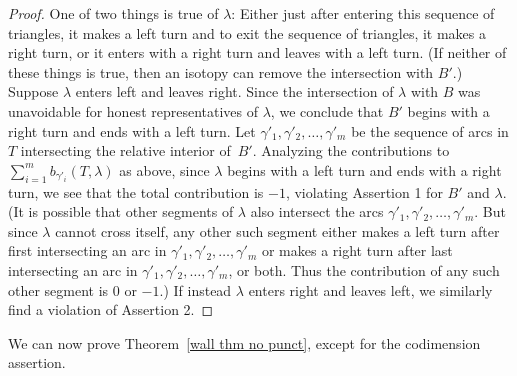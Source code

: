 \documentclass{amsart}
\theoremstyle{definition}
\theoremstyle{remark}
\numberwithin{equation}{section}
\newcommand{\0}{{\mathbf{0}}}
\begin{document}
\begin{proof}
One of two things is true of $\lambda$:  Either just after entering this sequence of triangles, it makes a left turn and to exit the sequence of triangles, it makes a right turn, or it enters with a right turn and leaves with a left turn.
(If neither of these things is true, then an isotopy can remove the intersection with $B'$.)
Suppose $\lambda$ enters left and leaves right.
Since the intersection of $\lambda$ with $B$ was unavoidable for honest representatives of $\lambda$, we conclude that $B'$ begins with a right turn and ends with a left turn.
Let $\gamma'_1, \gamma'_2,\ldots,\gamma'_m$ be the sequence of arcs in $T$ intersecting the relative interior of~$B'$.
Analyzing the contributions to $\sum_{i=1}^m b_{\gamma'_i}(T,\lambda)$ as above, since $\lambda$ begins with a left turn and ends with a right turn, we see that the total contribution is $-1$, violating Assertion 1 for $B'$ and $\lambda$.
(It is possible that other segments of $\lambda$ also intersect the arcs $\gamma'_1, \gamma'_2,\ldots,\gamma'_m$. 
But since $\lambda$ cannot cross itself, any other such segment either makes a left turn after first intersecting an arc in $\gamma'_1, \gamma'_2,\ldots,\gamma'_m$ or makes a right turn after last intersecting an arc in $\gamma'_1, \gamma'_2,\ldots,\gamma'_m$, or both.
Thus the contribution of any such other segment is $0$ or $-1$.)
If instead $\lambda$ enters right and leaves left, we similarly find a violation of Assertion 2.
\end{proof}

We can now prove Theorem~\ref{wall thm no punct}, except for the codimension assertion.
\end{document}
